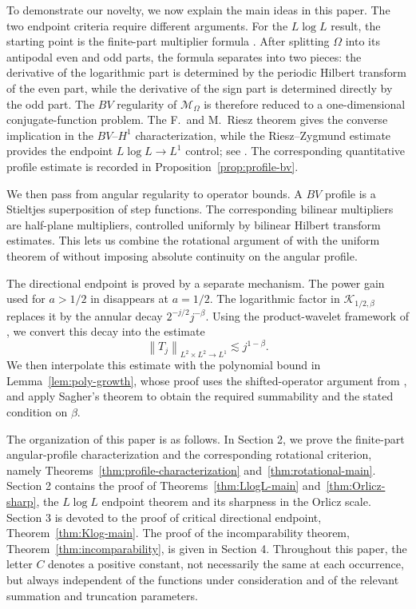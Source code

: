 \documentclass[11pt]{amsart}
\theoremstyle{remark}
\numberwithin{equation}{section}
\newcommand{\cK}{\mathcal K}
\newcommand{\cM}{\mathcal M}
\newcommand{\norm}[1]{\left\lVert #1\right\rVert}
\begin{document}
	To demonstrate our novelty, we now explain  the main ideas in this paper. The two endpoint criteria require different arguments.  For the \(L\log L\)
	result, the starting point is the finite-part multiplier formula
	\cite[Proposition~4.2.3]{GrafakosClassical}.  After splitting \(\Omega\) into
	its antipodal even and odd parts, the formula separates into two pieces:
	the derivative of the logarithmic part is determined by the periodic Hilbert
	transform of the even part, while the derivative of the sign part is determined
	directly by the odd part.  The \(BV\) regularity of \(\cM_\Omega\) is therefore
	reduced to a one-dimensional conjugate-function problem.  The F.~and M.~Riesz
	theorem gives the converse implication in the
	\(BV\)--\(H^1\) characterization, while the Riesz--Zygmund estimate provides
	the endpoint \(L\log L\to L^1\) control; see
	\cite[Chapter~VII]{Zygmund1959}.  The corresponding quantitative profile
	estimate is recorded in Proposition~\ref{prop:profile-bv}.
	
	We then pass from angular regularity to operator bounds.  A \(BV\) profile is a
	Stieltjes superposition of step functions.  The corresponding bilinear
	multipliers are half-plane multipliers, controlled uniformly by bilinear
	Hilbert transform estimates.  This lets us combine the rotational argument of
	\cite{DGHST2011} with the uniform theorem of
	\cite{UraltsevWarchalski2022} without imposing absolute continuity on the
	angular profile.
	
	The directional endpoint is proved by a separate mechanism.  The power gain
	used for \(a>1/2\) in \cite{DQX0404} disappears at \(a=1/2\).  The logarithmic
	factor in \(\cK_{1/2,\beta}\) replaces it by the annular decay
	\(2^{-j/2}j^{-\beta}\).  Using the product-wavelet framework of
	\cite{GrafakosHeHonzikPark2023}, we convert this decay into the estimate
	\[
	\norm{T_j}_{L^2\times L^2\to L^1}\lesssim j^{1-\beta}.
	\]
	We then interpolate this estimate with the polynomial bound in
	Lemma~\ref{lem:poly-growth}, whose proof uses the shifted-operator argument
	from \cite[the proof of Proposition~4]{dosidis_multilinear_2024}, and
	apply Sagher's theorem \cite{Sagher1969} to obtain the required summability and
	the stated condition on \(\beta\).
	
	The organization of this paper is as follows.  In Section 2, we prove the
	finite-part angular-profile characterization and the corresponding rotational
	criterion, namely Theorems~\ref{thm:profile-characterization}
	and~\ref{thm:rotational-main}.  Section 2  contains the proof of Theorems~\ref{thm:LlogL-main} and~\ref{thm:Orlicz-sharp}, the
	\(L\log L\) endpoint theorem and its sharpness in the Orlicz scale.
	Section 3 is devoted
	to the proof of critical directional endpoint, Theorem~\ref{thm:Klog-main}.  The proof
	of the incomparability theorem, Theorem~\ref{thm:incomparability}, is given in
	Section 4.  Throughout this paper, the letter \(C\) denotes a positive constant,
	not necessarily the same at each occurrence, but always independent of the
	functions under consideration and of the relevant summation and truncation
	parameters.
	\vspace{0.3cm}
	
\end{document}
